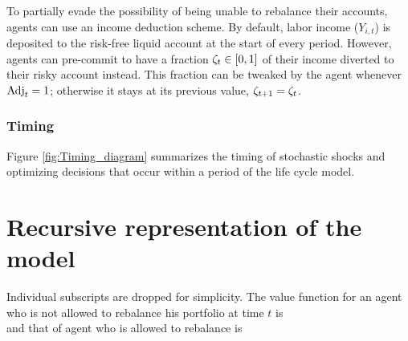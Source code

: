 \documentclass[./RiskyContrib.tex]{subfiles}
\begin{document}
To partially evade the possibility of being unable to rebalance their accounts, agents
can use an income deduction scheme. By default, labor income ($Y_{i,t}$) is deposited to
the risk-free liquid account at the start of every period. However, agents can pre-commit
to have a fraction  $\zeta_t\in[0,1]$ of their income diverted to their risky account instead.
This fraction can be tweaked by the agent whenever $\text{Adj}_t = 1$; otherwise it stays at its
previous value, $\zeta_{t+1} = \zeta_t$.

\subsubsection{Timing}



Figure \ref{fig:Timing_diagram} summarizes the timing of stochastic shocks and
optimizing decisions that occur within a period of the life cycle model.

\hypertarget{Recursive}{}
\section{Recursive representation of the model}\label{sec:recursive}

Individual subscripts are dropped for simplicity. The value function for
an agent who is not allowed to rebalance his portfolio at time $t$ is
\begin{equation*}
    
\end{equation*}
and that of agent who is allowed to rebalance is
\begin{equation*}
    
\end{equation*}
\end{document}
